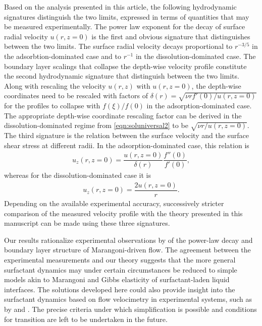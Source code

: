 \documentclass[]{jfm}
\begin{document}
Based on the analysis presented in this article, the following hydrodynamic signatures distinguish the two limits, expressed in terms of quantities that may be measured experimentally.
The power law exponent for the decay of surface radial velocity $u(r,z=0)$ is the first and obvious signature that distinguishes between the two limits.
The surface radial velocity decays proportional to  $r^{-3/5}$ in the adsorbtion-dominated case and to $r^{-1}$ in the dissolution-dominated case.
The boundary layer scalings that collapse the depth-wise velocity profile constitute the second hydrodynamic signature that distinguish between the two limits.
Along with rescaling the velocity $u(r,z)$ with $u(r,z=0)$, the depth-wise coordinates need to be rescaled with factors of $\delta(r)=\sqrt{\nu r f'(0) /u(r,z=0)}$ for the profiles to collapse with $f(\xi)/f(0)$ in the adsorption-dominated case.
The appropriate depth-wise coordinate rescaling factor can be derived in the dissolution-dominated regime from \eqref{eqn:soluniversal2} to be $\sqrt{\nu r/ u(r,z=0)}$.
The third signature is the relation between the surface velocity and the surface shear stress at different radii.
In the adsorption-dominated case, this relation is
\begin{align}
 u_z(r, z=0) = \dfrac{u(r,z=0)}{\delta(r) } \dfrac{f''(0)}{f'(0)},
\end{align}
whereas for the dissolution-dominated case it is
\begin{align}
 u_z(r,z=0) = \dfrac{2u(r,z=0)}{r}.
\end{align}
Depending on the available experimental accuracy, successively stricter comparison of the measured velocity profile with the theory presented in this manuscript can be made using these three signatures.

Our results rationalize experimental observations by \cite{Mandre2017a} of the power-law decay and boundary layer structure of Marangoni-driven flow.
The agreement between the experimental measurements and our theory suggests that the more general surfactant dynamics may under certain circumstances be reduced to simple models akin to Marangoni and Gibbs elasticity of surfactant-laden liquid interfaces.
The solutions developed here could also provide insight into the surfactant dynamics based on flow velocimetry in experimental systems, such as by \cite{Roche2014} and \cite{LeRoux2016}.
The precise criteria under which simplification is possible and conditions for transition are left to be undertaken in the future.
\end{document}

